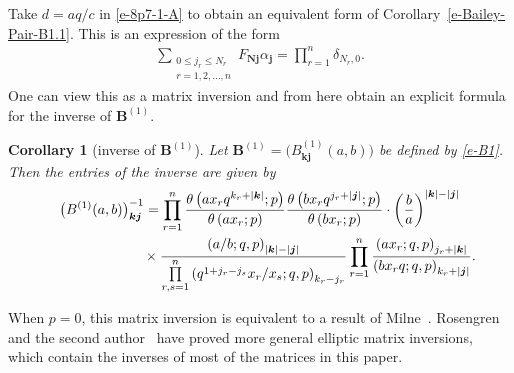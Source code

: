 \documentclass[pdftex]{sigma}
\numberwithin{equation}{section}
\newtheorem{Corollary}[Theorem]{Corollary}
\newenvironment{Remark*}{\begin{remark*}\normalfont}{\end{remark*}}
\newcommand\sumj{{\left| \boldsymbol {j} \right|}}
\newcommand\sumk{{\left| \boldsymbol{k} \right|}}
\newcommand{\B}{{ \mathbf B}}
\newcommand{\N}{{ \boldsymbol N}}
\renewcommand{\k}{{ \boldsymbol{k}}}
\renewcommand{\j}{{ \boldsymbol{j}}}
\newcommand{\multsum}[3]{{\sum\limits_{\substack{{0\le #1_#3 \le #2_#3} \\
{#3 =1,2,\dots, n}}}}}
\newcommand{\sqprod}[1]{\prod\limits_{r, s =1}^{#1}} %
\newcommand{\smallprod}[1]{\prod\limits_{r =1}^{#1}} %
\newcommand{\xover}[1]{#1_{r}/#1_{s}}
\newcommand{\ellipticqrfac}[2]{{\left({#1}; q, p\right)_{#2}}} %
\newcommand{\elliptictheta}[1]{\theta \left({#1} ; p\right) }
\begin{document}
Take $d=aq/c$ in \eqref{e-8p7-1-A} to obtain an equivalent form of Corollary~\ref{e-Bailey-Pair-B1.1}. This is an expression of the form
 \begin{gather}\label{n-Bailey-inversion}
 \multsum{j}{N}{r} F_{\N\j} \alpha_\j = \smallprod n \delta_{N_r, 0} .
\end{gather}
One can view this as a matrix inversion and from here obtain an explicit formula for the inverse of $\B^{(1)}$.
\begin{Corollary}[inverse of $\B^{(1)}$] \label{b1-inverse}
Let $\B^{(1)}= \big(B^{(1)}_{\k\j}(a,b)\big)$ be defined by \eqref{e-B1}. Then the entries of the inverse are given by
\begin{gather}
\big(B^{(1)}(a,b)\big)^{-1}_{\k \j} = \smallprod n \frac{\elliptictheta{ax_rq^{k_r+\sumk}}}{\elliptictheta{ax_r}}
\frac{\elliptictheta{bx_rq^{j_r+\sumj}}}{\elliptictheta{bx_r}}
\cdot
\left( \frac{b}{a}\right)^{\sumk-\sumj}\nonumber\\
\hphantom{\big(B^{(1)}(a,b)\big)^{-1}_{\k \j} =}{} \times
\frac{\ellipticqrfac{a/b}{\sumk-\sumj}}
{ \sqprod n \ellipticqrfac{q^{1+j_r-j_s}\xover x }{k_r-j_r}}
 \smallprod n \frac{\ellipticqrfac{ax_r}{j_r+\sumk}}{\ellipticqrfac{bx_rq}{k_r+\sumj}} .\label{e-B1-inverse}
\end{gather}
\end{Corollary}
\begin{Remark*}
When $p=0$, this matrix inversion is equivalent to a result of Milne~\cite[Theorem~3.41]{Milne1997}. Rosengren and the second author~\cite{RS2017} have proved more general elliptic matrix inversions, which contain the inverses of most of the matrices in this paper.
 \end{Remark*}
\end{document}

